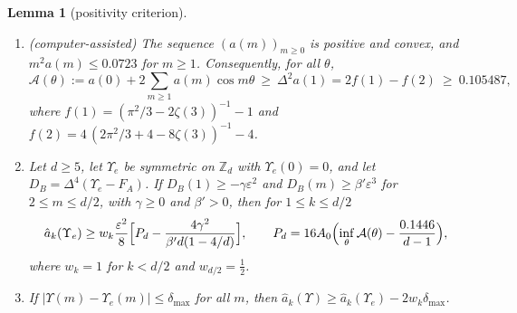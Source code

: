 \documentclass[11pt]{amsart}
\newtheorem{lemma}[theorem]{Lemma}
\theoremstyle{definition}
\theoremstyle{remark}
\numberwithin{equation}{section}
\newcommand{\Z}{\mathbb{Z}}
\begin{document}
\begin{lemma}[positivity criterion]\label{lem:P}
\begin{enumerate}
\item \emph{(computer-assisted)} The sequence $(a(m))_{m\ge0}$ is positive and convex, and $m^2a(m)\le0.0723$ for $m\ge1$.
Consequently, for all $\theta$,
\[
\mathcal A(\theta):=a(0)+2\sum_{m\ge1}a(m)\cos m\theta\ \ge\ \Delta^2a(1)=2f(1)-f(2)\ \ge\ 0.105487,
\]
where $f(1)=(\pi^2/3-2\zeta(3))^{-1}-1$ and $f(2)=4\,(2\pi^2/3+4-8\zeta(3))^{-1}-4$.
\item Let $d\ge5$, let $\Upsilon_e$ be symmetric on $\Z_d$ with $\Upsilon_e(0)=0$, and let $D_B=\Delta^4(\Upsilon_e-F_A)$. If $D_B(1)\ge-\gamma\varepsilon^2$
and $D_B(m)\ge\beta'\varepsilon^3$ for $2\le m\le d/2$, with $\gamma\ge0$ and $\beta'>0$, then for $1\le k\le d/2$
\[
\hat a_k(\Upsilon_e)\ge w_k\frac{\varepsilon^2}8\Bigl[P_d-\frac{4\gamma^2}{\beta'd(1-4/d)}\Bigr],\qquad P_d=16A_0\Bigl(\inf_\theta\mathcal A(\theta)-\frac{0.1446}{d-1}\Bigr),
\]
where $w_k=1$ for $k<d/2$ and $w_{d/2}=\frac12$.
\item If $|\Upsilon(m)-\Upsilon_e(m)|\le\delta_{\max}$ for all $m$, then $\hat a_k(\Upsilon)\ge\hat a_k(\Upsilon_e)-2w_k\delta_{\max}$.
\end{enumerate}
\end{lemma}
\end{document}
